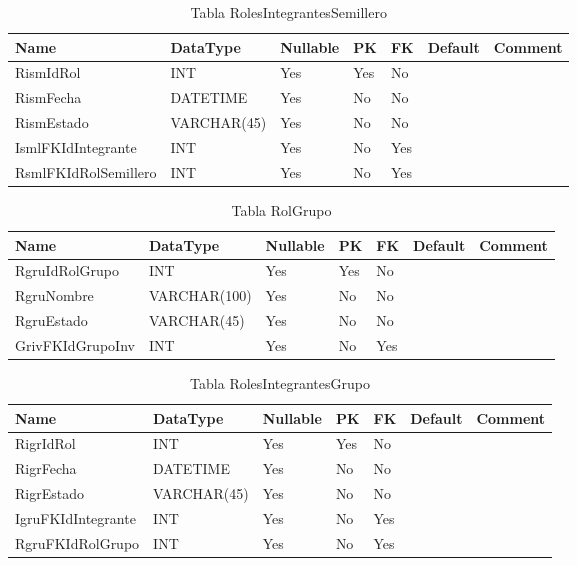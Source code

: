 \begin{table}
	\caption{Tabla RolesIntegrantesSemillero}
	\label{labelTableRolesIntegrantesSemillero}
	\begin{tabular}{ |l|l|l|l|l|l|l| }
		\hline
		Name & DataType & Nullable & PK & FK & Default & Comment \\ \hline
		RismIdRol & INT & Yes & Yes & No &  & \\ \hline 
		RismFecha & DATETIME & Yes & No & No &  & \\ \hline 
		RismEstado & VARCHAR(45) & Yes & No & No &  & \\ \hline 
		IsmlFKIdIntegrante & INT & Yes & No & Yes &  & \\ \hline 
		RsmlFKIdRolSemillero & INT & Yes & No & Yes &  & \\ \hline 
		
	\end{tabular}
\end{table}


\begin{table}
	\caption{Tabla RolGrupo}
	\label{labelTableRolGrupo}
	\begin{tabular}{ |l|l|l|l|l|l|l| }
		\hline
		Name & DataType & Nullable & PK & FK & Default & Comment \\ \hline
		RgruIdRolGrupo & INT & Yes & Yes & No &  & \\ \hline 
		RgruNombre & VARCHAR(100) & Yes & No & No &  & \\ \hline 
		RgruEstado & VARCHAR(45) & Yes & No & No &  & \\ \hline 
		GrivFKIdGrupoInv & INT & Yes & No & Yes &  & \\ \hline 
		
	\end{tabular}
\end{table}


\begin{table}
	\caption{Tabla RolesIntegrantesGrupo}
	\label{labelTableRolesIntegrantesGrupo}
	\begin{tabular}{ |l|l|l|l|l|l|l| }
		\hline
		Name & DataType & Nullable & PK & FK & Default & Comment \\ \hline
		RigrIdRol & INT & Yes & Yes & No &  & \\ \hline 
		RigrFecha & DATETIME & Yes & No & No &  & \\ \hline 
		RigrEstado & VARCHAR(45) & Yes & No & No &  & \\ \hline 
		IgruFKIdIntegrante & INT & Yes & No & Yes &  & \\ \hline 
		RgruFKIdRolGrupo & INT & Yes & No & Yes &  & \\ \hline 
		
	\end{tabular}
\end{table}


